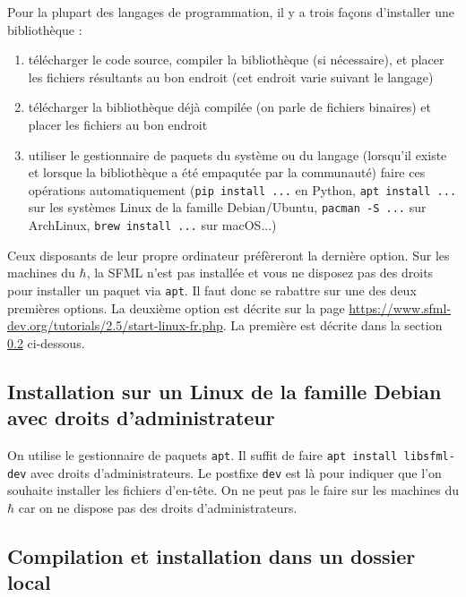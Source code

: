 \documentclass{book}
\begin{document}
\vspace{1em}

Pour la plupart des langages de programmation, il y a trois façons d'installer une bibliothèque :
\begin{enumerate}
  \item télécharger le code source, compiler la bibliothèque (si nécessaire), et placer les fichiers résultants au bon endroit (cet endroit varie suivant le langage)
  \item télécharger la bibliothèque déjà compilée (on parle de fichiers binaires) et placer les fichiers au bon endroit
  \item utiliser le gestionnaire de paquets du système ou du langage (lorsqu'il existe et lorsque la bibliothèque a été empaqutée par la communauté) faire ces opérations automatiquement (\texttt{pip install ...} en Python, \texttt{apt install ...} sur les systèmes Linux de la famille Debian/Ubuntu, \texttt{pacman -S ...} sur ArchLinux, \texttt{brew install ...} sur macOS...)
\end{enumerate}

Ceux disposants de leur propre ordinateur préfèreront la dernière option. Sur les machines du $\hbar$, la SFML n'est pas installée et vous ne disposez pas des droits pour installer un paquet via \texttt{apt}. Il faut donc se rabattre sur une des deux premières options. La deuxième option est décrite sur la page \url{https://www.sfml-dev.org/tutorials/2.5/start-linux-fr.php}. La première est décrite dans la section \ref{sec:Compilation et installation dans un dossier local} ci-dessous.

\subsection{Installation sur un Linux de la famille Debian avec droits d'administrateur}

On utilise le gestionnaire de paquets \texttt{apt}. Il suffit de faire \texttt{apt install libsfml-dev} avec droits d'administrateurs. Le postfixe \texttt{dev} est là pour indiquer que l'on souhaite installer les fichiers d'en-tête. On ne peut pas le faire sur les machines du $\hbar$ car on ne dispose pas des droits d'administrateurs.

\subsection{Compilation et installation dans un dossier local}
\label{sec:Compilation et installation dans un dossier local}
\end{document}
